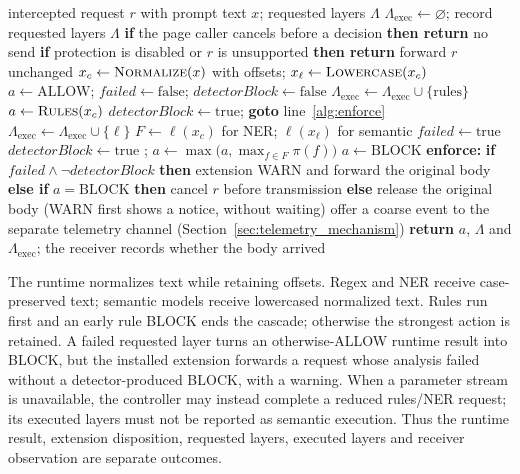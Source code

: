\documentclass[sigconf]{acmart}
\theoremstyle{acmdefinition}\newtheorem{property}{Property}
\begin{document}
\begin{algorithm}[t]
\caption{Prototype runtime analysis and extension disposition for a recognized supported request. Layers are ordered rules $<$ NER $<$ semantic; $\max$ uses ALLOW $<$ WARN $<$ BLOCK.}
\label{alg:workflow}
\begin{algorithmic}[1]
\Require intercepted request $r$ with prompt text $x$; requested layers $\Lambda$
\State $\Lambda_{\mathrm{exec}}\gets\varnothing$; record requested layers $\Lambda$
\State \textbf{if} the page caller cancels before a decision \textbf{then return} no send
\State \textbf{if} protection is disabled or $r$ is unsupported \textbf{then return} forward $r$ unchanged
\State $x_c\gets\textsc{Normalize}(x)$ with offsets; $x_\ell\gets\textsc{Lowercase}(x_c)$
\State $a\gets\text{ALLOW}$;\; $\mathit{failed}\gets\text{false}$;\; $\mathit{detectorBlock}\gets\text{false}$
  \State $\Lambda_{\mathrm{exec}}\gets\Lambda_{\mathrm{exec}}\cup\{\text{rules}\}$
  \State $a\gets\textsc{Rules}(x_c)$
   $\mathit{detectorBlock}\gets\text{true}$; \textbf{goto} line~\ref{alg:enforce} \EndIf {}
\EndIf
{}
  \State $\Lambda_{\mathrm{exec}}\gets\Lambda_{\mathrm{exec}}\cup\{\ell\}$
  \State $F\gets\ell(x_c)$ for NER; $\ell(x_\ell)$ for semantic
   $\mathit{failed}\gets\text{true}$
  \Else{}  $\mathit{detectorBlock}\gets\text{true}$ \EndIf; $a\gets\max\bigl(a,\max_{f\in F}\pi(f)\bigr)$ \EndIf
\EndFor
{} $a\gets\text{BLOCK}$ \EndIf {}
\State \textbf{enforce:}\label{alg:enforce} \textbf{if} $\mathit{failed}\wedge\neg\mathit{detectorBlock}$ \textbf{then} extension WARN and forward the original body
\State \textbf{else if} $a=\text{BLOCK}$ \textbf{then} cancel $r$ before transmission
\State \textbf{else} release the original body (WARN first shows a notice, without waiting)
\State offer a coarse event to the separate telemetry channel (Section~\ref{sec:telemetry_mechanism})
\State \textbf{return} $a$, $\Lambda$ and $\Lambda_{\mathrm{exec}}$; the receiver records whether the body arrived
\end{algorithmic}
\end{algorithm}

The runtime normalizes text while retaining offsets. Regex and NER receive case-preserved text; semantic models receive lowercased normalized text. Rules run first and an early rule BLOCK ends the cascade; otherwise the strongest action is retained. A failed requested layer turns an otherwise-ALLOW runtime result into BLOCK, but the installed extension forwards a request whose analysis failed without a detector-produced BLOCK, with a warning. When a parameter stream is unavailable, the controller may instead complete a reduced rules/NER request; its executed layers must not be reported as semantic execution. Thus the runtime result, extension disposition, requested layers, executed layers and receiver observation are separate outcomes.
\end{document}
